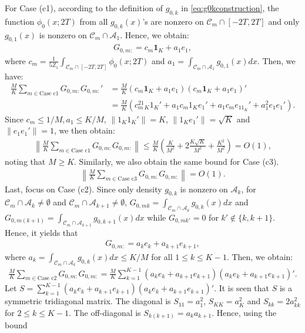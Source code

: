 \documentclass[preprint,11pt]{article}
\newcommand{\mbf}{\mathbf}
\newcommand{\mcal}{\mathcal}
\numberwithin{equation}{section}
\begin{document}
For Case (c1), according to the definition of $g_{0,k}$ in \eqref{eq:g0kconstruction}, the function $\phi_0(x;2T)$ from all $g_{0,k}(x)$'s are nonzero on $\mcal{C}_m\cap[-2T,2T]$ and only $g_{0,1}(x)$ is nonzero on $\mcal{C}_m\cap \mcal{A}_1$. Hence, we obtain:
\begin{align*}
    G_{0,m:}=c_m\mbf{1}_K+a_1e_1,
\end{align*}
where $c_m = \frac{1}{5Z_1  }\int_{\mcal{C}_m\cap[-2T,2T]}\phi_0(x;2T)$ and $a_1 = \int_{\mcal{C}_m\cap \mcal{A}_1}g_{0,1}(x)dx$. Then, we have:
\begin{align*}
    \frac{M}{K}\sum_{m\in \text{Case c1}}G_{0,m:}G_{0,m:}'&=\frac{M}{K}(c_m\mbf{1}_K+a_1e_1)(c_m\mbf{1}_K+a_1e_1)'\\
    &=\frac{M}{K}(c_m^21_K1_K'+a_1c_m1_Ke_1'+a_1c_me_11_K'+a_1^2e_1e_1').
\end{align*}
Since $c_m\le 1/M, a_1\le K/M$, $\|1_K1_K'\|=K$, $\|1_Ke_1'\|=\sqrt{K}$ and $\|e_1e_1'\|=1$, we then obtain:
\begin{align*}
    \left\|\frac{M}{K}\sum_{m\in \text{Case c1}}G_{0,m:}G_{0,m:}\right\|\le \frac{M}{K}\left(\frac{K}{M^2}+2\frac{K\sqrt{K}}{M^2}+\frac{K^2}{M^2}\right)=O(1),
\end{align*}
noting that $M\ge K$. Similarly, we also obtain the same bound for Case (c3).
\begin{align*}
    \left\|\frac{M}{K}\sum_{m\in \text{Case c3}}G_{0,m:}G_{0,m:}\right\|=O(1).
\end{align*}
Last, focus on Case (c2). Since only density $g_{0,k}$ is nonzero on $\mcal{A}_k$, for $\mcal{C}_m\cap\mcal{A}_{k}\neq\emptyset$ and $\mcal{C}_m\cap\mcal{A}_{k+1}\neq\emptyset$, $G_{0,mk}=\int_{\mcal{C}_m\cap\mcal{A}_k}g_{0,k}(x)dx$ and $G_{0,m(k+1)}=\int_{\mcal{C}_m\cap\mcal{A}_{k+1}}g_{0,k+1}(x)dx$ while $G_{0,mk'}=0$ for $k'\notin\{k,k+1\}$. Hence, it yields that 
\begin{align*}
    G_{0,m:}=a_ke_k+a_{k+1}e_{k+1},
\end{align*}
where $a_k = \int_{\mcal{C}_m\cap \mcal{A}_k}g_{0,k}(x)dx\le K/M$ for all $1\le k\le K-1$. Then, we obtain:
\begin{align*}
    \frac{M}{K}\sum_{m\in \text{Case c2}}G_{0,m:}G_{0,m:} = \frac{M}{K}\sum_{k=1}^{K-1}(a_ke_k+a_{k+1}e_{k+1})(a_ke_k+a_{k+1}e_{k+1})'.
\end{align*}
Let $S = \sum_{k=1}^{K-1}(a_ke_k+a_{k+1}e_{k+1})(a_ke_k+a_{k+1}e_{k+1})'$. It is seen that $S$ is a symmetric tridiagonal matrix. The diagonal is $S_{11}=a_1^2$, $S_{KK}=a_K^2$ and $S_{kk}=2a_{kk}^2$ for $2\le k\le K-1$. The off-diagonal is $S_{k(k+1)}=a_ka_{k+1}$. Hence, using the bound
\end{document}

